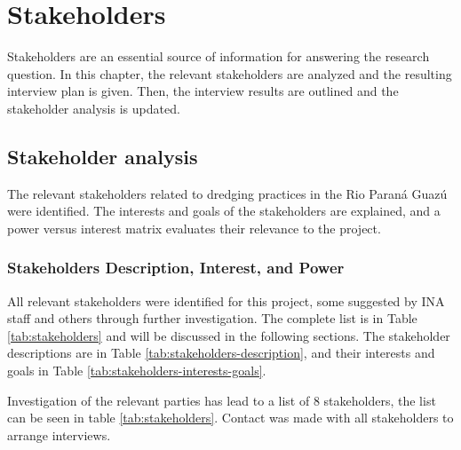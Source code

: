 \chapter{Stakeholders}
\label{chapter:stakeholders}
Stakeholders are an essential source of information for answering the research question. In this chapter, the relevant stakeholders are analyzed and the resulting interview plan is given. Then, the interview results are outlined and the stakeholder analysis is updated. 

\section{Stakeholder analysis} \label{par:stakeholderanalysis}
The relevant stakeholders related to dredging practices in the Rio Paraná Guazú were identified. The interests and goals of the stakeholders are explained, and a power versus interest matrix evaluates their relevance to the project.

\subsection{Stakeholders Description, Interest, and Power}
All relevant stakeholders were identified for this project, some suggested by INA staff and others through further investigation. The complete list is in Table \ref{tab:stakeholders} and will be discussed in the following sections. The stakeholder descriptions are in Table \ref{tab:stakeholders-description}, and their interests and goals in Table \ref{tab:stakeholders-interests-goals}.

Investigation of the relevant parties has lead to a list of 8 stakeholders, the list can be seen in table \ref{tab:stakeholders}. Contact was made with all stakeholders to arrange interviews.

